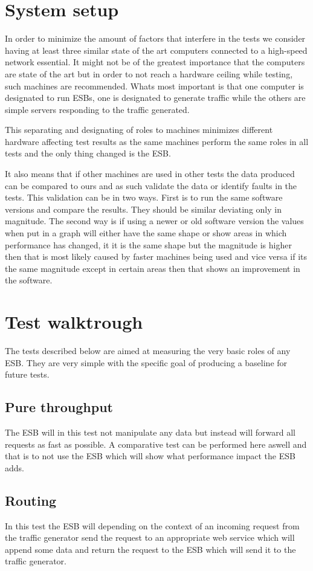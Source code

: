 \documentclass[11pt]{article} %
\begin{document}
\section{System setup}
 In order to minimize the amount of factors that interfere in the tests we consider having at least three similar state of the art computers connected to a high-speed network essential.
It might not be of the greatest importance that the computers are state of the art but in order to not reach a hardware ceiling while testing, such machines are recommended. Whats most important is that one computer is designated to run ESBs, one is designated to generate traffic while the others are simple servers responding to the traffic generated. 

This separating and designating of roles to machines minimizes different hardware affecting test results as the same machines perform the same roles in all tests and the only thing changed is the ESB. 

It also means that if other machines are used in other tests the data produced can be compared to ours and as such validate the data or identify faults in the tests. This validation can be in two ways. First is to run the same software versions and compare the results. They should be similar deviating only in magnitude. The second way is if using a newer or old software version the values when put in a graph will either have the same shape or show areas in which performance has changed, it it is the same shape but the magnitude is higher then that is most likely caused by faster machines being used and vice versa if its the same magnitude except in certain areas then that shows an improvement in the software.

\section{Test walktrough}
The tests described below are aimed at measuring the very basic roles of any ESB. They are very simple with the specific goal of producing a baseline for future tests.
\subsection{Pure throughput}
The ESB will in this test not manipulate any data but instead will forward all requests as fast as possible. 
A comparative test can be performed here aswell and that is to not use the ESB which will show what performance impact the ESB adds. 
\subsection{Routing}
In this test the ESB will depending on the context of an incoming request from the traffic generator send the request to an appropriate web service which will append some data and return the request to the ESB which will send it to the traffic generator.
\end{document}
